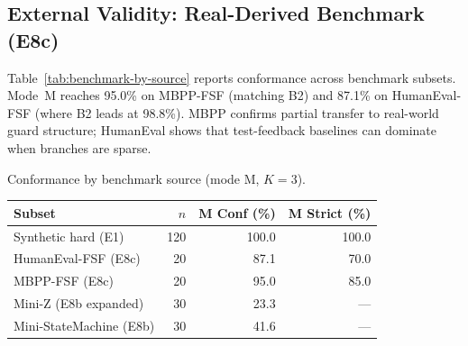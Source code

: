 \begin{table}[H]
  \caption{\textbf{Key observation:} M leads B1 on all notations; adapter
    absolute conformance is low on the expanded $n{=}30$ corpus (E8b).
    HumanEval-FSF and MBPP-FSF rows report full B1/B2/M from
    \texttt{run\_e8c\_full\_v1}.}
  \label{tab:generalisation}
  \centering
\end{table}

\subsection{External Validity: Real-Derived Benchmark (E8c)}
\label{subsec:results:real-derived}

Table~\ref{tab:benchmark-by-source} reports conformance across benchmark subsets.
Mode~M reaches 95.0\% on MBPP-FSF (matching B2) and 87.1\% on HumanEval-FSF
(where B2 leads at 98.8\%).
MBPP confirms partial transfer to real-world guard structure; HumanEval shows
that test-feedback baselines can dominate when branches are sparse.

\begin{inlinetable}{Conformance by benchmark source (mode M, $K=3$).}
  \label{tab:benchmark-by-source}
  \footnotesize
  \begin{tabular}{lrrr}
    \toprule
    Subset & $n$ & M Conf (\%) & M Strict (\%) \\
    \midrule
    Synthetic hard (E1)          & 120 & 100.0 & 100.0 \\
    HumanEval-FSF (E8c)          & 20  & 87.1 & 70.0 \\
    MBPP-FSF (E8c)               & 20  & 95.0 & 85.0 \\
    Mini-Z (E8b expanded)        & 30  & 23.3 & --- \\
    Mini-StateMachine (E8b)      & 30  & 41.6 & --- \\
    \bottomrule
  \end{tabular}
\end{inlinetable}


